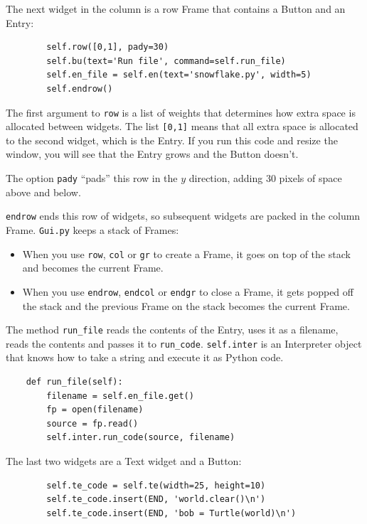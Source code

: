 \documentclass[10pt]{book}
\begin{document}
\begin{CJK}{UTF8}{gbsn}
The next widget in the column is a row Frame that contains
a Button and an Entry:

\begin{verbatim}
        self.row([0,1], pady=30)
        self.bu(text='Run file', command=self.run_file)
        self.en_file = self.en(text='snowflake.py', width=5)
        self.endrow()
\end{verbatim}
%
The first argument to {\tt row} is a list of weights that
determines how extra space is allocated between widgets.  
The list {\tt [0,1]} means that all extra space is allocated
to the second widget, which is the Entry.  If you run this code
and resize the window, you will see that the Entry grows and
the Button doesn't.

The option {\tt pady} ``pads'' this row in the $y$ direction,
adding 30 pixels of space above and below.

{\tt endrow} ends this row of widgets, so subsequent widgets are
packed in the column Frame.  {\tt Gui.py} keeps a stack of Frames:

\begin{itemize}

\item When you use {\tt row}, {\tt col} or {\tt gr} to create a Frame,
it goes on top of the stack and becomes the current Frame.

\item When you use {\tt endrow}, {\tt endcol} or {\tt endgr} to close
a Frame, it gets popped off the stack and the previous Frame on the
stack becomes the current Frame.

\end{itemize} 

The method \verb"run_file" reads the contents of the Entry,
uses it as a filename, reads the contents
and passes it to \verb"run_code".  {\tt self.inter} is an
Interpreter object that knows how to take a string and
execute it as Python code.

\begin{verbatim}
    def run_file(self):
        filename = self.en_file.get()
        fp = open(filename)
        source = fp.read()
        self.inter.run_code(source, filename)
\end{verbatim}
%
The last two widgets are a Text widget and a Button:

\begin{verbatim}
        self.te_code = self.te(width=25, height=10)
        self.te_code.insert(END, 'world.clear()\n')
        self.te_code.insert(END, 'bob = Turtle(world)\n')


\end{verbatim}
\end{CJK}
\end{document}
